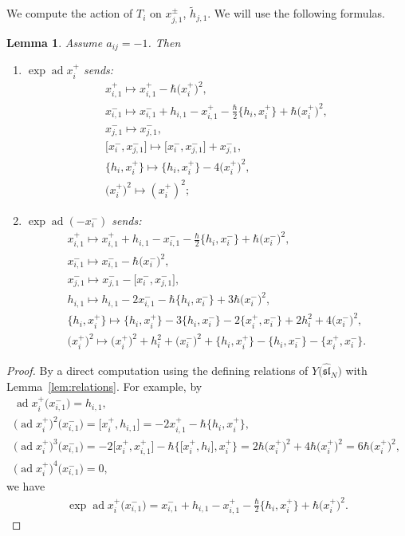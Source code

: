 \documentclass[11pt]{article}
\newtheorem{lem}[thm]{Lemma}
\theoremstyle{definition}
\numberwithin{equation}{section}
\DeclareMathOperator{\ad}{ad}
\newcommand{\affY}{Y\big(\affsl\big)}
\newcommand{\affsl}{\hat{\mathfrak{sl}}_N}
\begin{document}
We compute the action of $T_i$ on $x_{j,1}^{\pm}$, $\tilde{h}_{j,1}$. We will use the following formulas.
\begin{lem}\label{lem:expad2}Assume $a_{ij}=-1$. Then
\begin{enumerate}\itemsep=0pt
\item $\exp\ad x_{i}^{+}$ sends:
\begin{gather*}
x_{i,1}^+ \mapsto x_{i,1}^+-\hbar \big(x_i^+\big)^2,\\
x_{i,1}^- \mapsto x_{i,1}^- + h_{i,1}-x_{i,1}^+ -\tfrac{\hbar}{2}\big\{ h_i, x_i^+\big\} + \hbar \big(x_i^+\big)^2,\\
x_{j,1}^- \mapsto x_{j,1}^-,\\
\big[x_i^-,x_{j,1}^-\big] \mapsto \big[x_i^-,x_{j,1}^-\big]+x_{j,1}^-,\\
\big\{h_i,x_i^+\big\} \mapsto \big\{h_i,x_i^+\big\} - 4\big(x_i^+\big)^2,\\
\big(x_i^+\big)^2 \mapsto (x_i^+)^2;
\end{gather*}
\item $\exp\ad (-x_{i}^{-})$ sends:
\begin{gather*}
x_{i,1}^+ \mapsto x_{i,1}^+ + h_{i,1}-x_{i,1}^- -\tfrac{\hbar}{2}\big\{ h_i, x_i^-\big\} + \hbar \big(x_i^-\big)^2,\\
x_{i,1}^- \mapsto x_{i,1}^- - \hbar\big(x_i^-\big)^2,\\
x_{j,1}^- \mapsto x_{j,1}^- - \big[x_i^-,x_{j,1}^-\big],\\
h_{i,1} \mapsto h_{i,1} - 2x_{i,1}^- - \hbar\big\{ h_i, x_i^- \big\} + 3\hbar \big(x_i^-\big)^2,\\
\big\{h_i,x_i^+\big\} \mapsto \big\{h_i,x_i^+\big\} - 3\big\{h_i,x_i^-\big\} - 2\big\{x_i^+,x_i^-\big\} + 2h_i^2 + 4\big(x_i^-\big)^2,\\
\big(x_i^+\big)^2 \mapsto \big(x_i^+\big)^2 + h_i^2 + \big(x_i^-\big)^2+ \big\{h_i,x_i^+\big\} - \big\{h_i,x_i^-\big\} - \big\{x_i^+,x_i^-\big\}.
\end{gather*}
\end{enumerate}
\end{lem}
\begin{proof}By a direct computation using the defining relations of $\affY$ with Lemma~\ref{lem:relations}. For example, by
\begin{gather*}
\ad x_i^{+} \big(x_{i,1}^-\big) = h_{i,1}, \\
\big(\ad x_i^{+}\big)^2 \big(x_{i,1}^-\big) = \big[x_i^+,h_{i,1}\big] = -2x_{i,1}^+ - \hbar \big\{h_i,x_i^+\big\}, \\
\big(\ad x_i^{+}\big)^3 \big(x_{i,1}^-\big) = -2 \big[x_i^+, x_{i,1}^+\big] - \hbar \big\{\big[x_i^+,h_i\big],x_i^+\big\} = 2\hbar\big(x_i^+\big)^2 + 4\hbar \big(x_i^+\big)^2 = 6\hbar\big(x_i^+\big)^2, \\
\big(\ad x_i^{+}\big)^4 \big(x_{i,1}^-\big)=0,
\end{gather*}
we have
\begin{gather*}
\exp\ad x_i^+ \big(x_{i,1}^-\big) = x_{i,1}^- + h_{i,1} - x_{i,1}^+ - \tfrac{\hbar}{2} \big\{h_i,x_i^+\big\} + \hbar\big(x_i^+\big)^2.\tag*{\qed}
\end{gather*}\renewcommand{\qed}{}
\end{proof}
\end{document}
